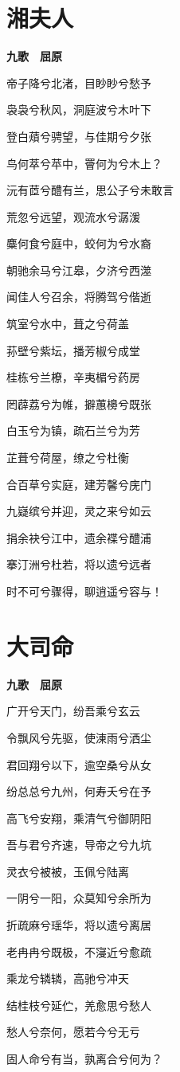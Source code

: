 \documentclass[12pt,a4paper]{ctexbook}
\begin{document}
\section{湘夫人}
\textbf{九歌　屈原}\par\vspace{0.5em}
帝子降兮北渚，目眇眇兮愁予\par
袅袅兮秋风，洞庭波兮木叶下\par
登白薠兮骋望，与佳期兮夕张\par
鸟何萃兮苹中，罾何为兮木上？\par
沅有茝兮醴有兰，思公子兮未敢言\par
荒忽兮远望，观流水兮潺湲\par
麋何食兮庭中，蛟何为兮水裔\par
朝驰余马兮江皋，夕济兮西澨\par
闻佳人兮召余，将腾驾兮偕逝\par
筑室兮水中，葺之兮荷盖\par
荪壁兮紫坛，播芳椒兮成堂\par
桂栋兮兰橑，辛夷楣兮药房\par
罔薜荔兮为帷，擗蕙櫋兮既张\par
白玉兮为镇，疏石兰兮为芳\par
芷葺兮荷屋，缭之兮杜衡\par
合百草兮实庭，建芳馨兮庑门\par
九嶷缤兮并迎，灵之来兮如云\par
捐余袂兮江中，遗余褋兮醴浦\par
搴汀洲兮杜若，将以遗兮远者\par
时不可兮骤得，聊逍遥兮容与！\par

\section{大司命}
\textbf{九歌　屈原}\par\vspace{0.5em}
广开兮天门，纷吾乘兮玄云\par
令飘风兮先驱，使涷雨兮洒尘\par
君回翔兮以下，逾空桑兮从女\par
纷总总兮九州，何寿夭兮在予\par
高飞兮安翔，乘清气兮御阴阳\par
吾与君兮齐速，导帝之兮九坑\par
灵衣兮被被，玉佩兮陆离\par
一阴兮一阳，众莫知兮余所为\par
折疏麻兮瑶华，将以遗兮离居\par
老冉冉兮既极，不寖近兮愈疏\par
乘龙兮辚辚，高驰兮冲天\par
结桂枝兮延伫，羌愈思兮愁人\par
愁人兮奈何，愿若今兮无亏\par
固人命兮有当，孰离合兮何为？\par
\end{document}
